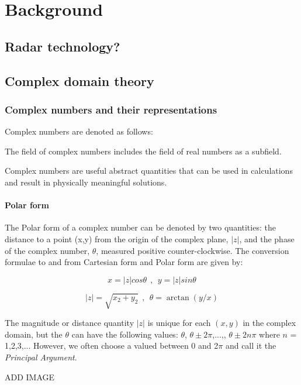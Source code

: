 \chapter{Background}\label{chap:comp}
\section{Radar technology?}


\section{Complex domain theory}

\subsection{Complex numbers and their representations}
Complex numbers are denoted as follows:

The field of complex numbers includes the field of real numbers as a subfield.

Complex numbers are useful abstract quantities that can be used in calculations and result in physically meaningful solutions.


\subsubsection{Polar form}
The Polar form of a complex number can be denoted by two quantities: 
the distance to a point (x,y) from the origin of the complex plane, $|z|$, and the phase of the complex number, $\theta$, measured positive counter-clockwise. The conversion formulae to and from Cartesian form and Polar form are given by:

\begin{equation}\label{eq:compdiff}
x = |z|cos\theta  ~~,~~ y = |z|sin\theta 
\end{equation}

\begin{equation}\label{eq:compdiff}
|z| = \sqrt{x_{2}+y_{2}}  ~~,~~ \theta = \arctan(y/x) 
\end{equation}

The magnitude or distance quantity $|z|$ is unique for each $(x,y)$ in the complex domain, but the $\theta$ can have the following values: $\theta$, $\theta \pm \mathrm{2}\pi$,...,, $\theta \pm \mathrm{2}n\pi$ where $n$ = 1,2,3,... However, we often choose a valued between $0$ and 2$\pi$ and call it the \textit{Principal Argument}.

ADD IMAGE 


